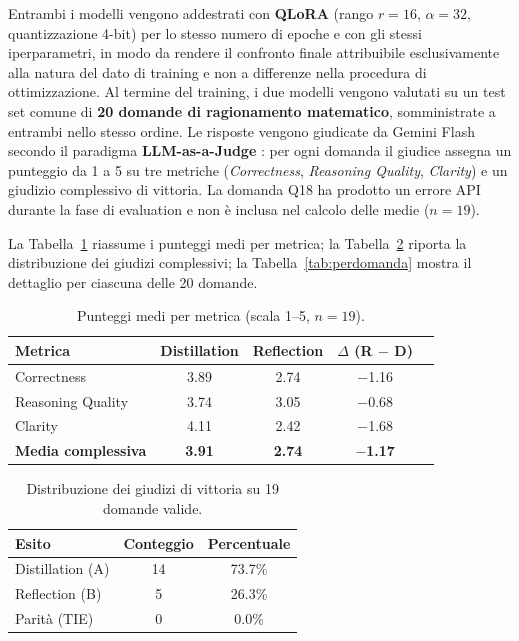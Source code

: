 Entrambi i modelli vengono addestrati con \textbf{QLoRA} (rango
$r = 16$, $\alpha = 32$, quantizzazione 4-bit) per lo stesso numero
di epoche e con gli stessi iperparametri, in modo da rendere il
confronto finale attribuibile esclusivamente alla natura del dato
di training e non a differenze nella procedura di ottimizzazione.
Al termine del training, i due modelli vengono valutati su un test
set comune di \textbf{20 domande di ragionamento matematico},
somministrate a entrambi nello stesso ordine. Le risposte vengono
giudicate da Gemini Flash secondo il paradigma \textbf{LLM-as-a-Judge}
\cite{zheng2023judging}: per ogni domanda il giudice assegna un
punteggio da 1 a 5 su tre metriche (\emph{Correctness},
\emph{Reasoning Quality}, \emph{Clarity}) e un giudizio complessivo
di vittoria. La domanda Q18 ha prodotto un errore API durante la
fase di evaluation e non è inclusa nel calcolo delle medie ($n = 19$).

La Tabella~\ref{tab:medie} riassume i punteggi medi per metrica;
la Tabella~\ref{tab:winner} riporta la distribuzione dei giudizi
complessivi; la Tabella~\ref{tab:perdomanda} mostra il dettaglio
per ciascuna delle 20 domande.

\begin{table}[tbp]
  \centering
  \caption{Punteggi medi per metrica (scala 1--5, $n = 19$).}
  \label{tab:medie}
  \small
  \renewcommand{\arraystretch}{1.4}
  \begin{tabular}{lcccc}
    \toprule
    \textbf{Metrica} &
    \textbf{Distillation} &
    \textbf{Reflection} &
    \textbf{$\Delta$ (R $-$ D)} \\
    \midrule
    Correctness       & 3.89 & 2.74 & $-$1.16 \\
    Reasoning Quality & 3.74 & 3.05 & $-$0.68 \\
    Clarity           & 4.11 & 2.42 & $-$1.68 \\
    \midrule
    \textbf{Media complessiva} & \textbf{3.91} & \textbf{2.74} & $-$\textbf{1.17} \\
    \bottomrule
  \end{tabular}
\end{table}

\begin{table}[tbp]
  \centering
  \caption{Distribuzione dei giudizi di vittoria su 19 domande valide.}
  \label{tab:winner}
  \small
  \renewcommand{\arraystretch}{1.4}
  \begin{tabular}{lcc}
    \toprule
    \textbf{Esito} & \textbf{Conteggio} & \textbf{Percentuale} \\
    \midrule
    Distillation (A) & 14 & 73.7\% \\
    Reflection (B)   &  5 & 26.3\% \\
    Parità (TIE)     &  0 &  0.0\% \\
    \bottomrule
  \end{tabular}
\end{table}


